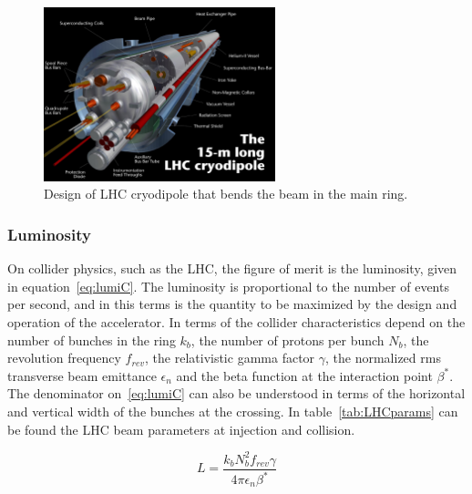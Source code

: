 \begin{figure}[!Hhtbp]
  \begin{center}
    \includegraphics[width=0.6\textwidth]{figs/cryodipole.jpg}
    \caption{Design of LHC cryodipole that bends the beam in the main ring.}
    \label{fig:dipole}
  \end{center}
\end{figure}

\subsubsection{Luminosity}
\label{sec:lumi}

On collider physics, such as the LHC, the figure of merit is the luminosity, given in equation~\ref{eq:lumiC}. The luminosity is proportional to the number of events per second, and in this terms is the quantity to be maximized by the design and operation of the accelerator. In terms of the collider characteristics depend on the number of bunches in the ring $k_{b}$, the number of protons per bunch $N_{b}$, the revolution frequency $f_{rev}$, the relativistic gamma factor $\gamma$, the normalized rms transverse beam emittance $\epsilon_{n}$ and the beta function at the interaction point $\beta^{*}$. The denominator on~\ref{eq:lumiC} can also be understood in terms of the horizontal and vertical width of the bunches at the crossing. In table~\ref{tab:LHCparams} can be found the LHC beam parameters at injection and collision.  

\begin{equation}
  \label{eq:lumiC}
  L=\frac{k_{b}N_{b}^{2}f_{rev}\gamma}{4\pi\epsilon_{n}\beta^{*}}
\end{equation}

